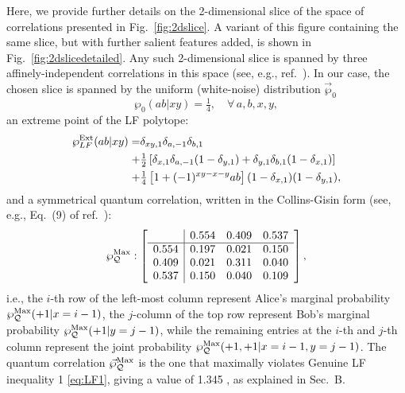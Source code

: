 \documentclass[aps,prx,twocolumn,superscriptaddress]{revtex4-1}
\theoremstyle{plain}
\newcommand{\ie}{i.e.}
\newcommand{\eg}{e.g.}
\begin{document}
Here, we provide further details on the 2-dimensional slice of the space of correlations presented in Fig.~\ref{fig:2dslice}. A variant of this figure containing the same slice, but with further salient features added, is shown in Fig.\ \ref{fig:2dslicedetailed}. Any such 2-dimensional slice is spanned by three affinely-independent correlations in this space (see, \eg, ref.~\cite{Goh18}). In our case, the chosen slice is spanned by the uniform (white-noise) distribution $\vec{\wp}_0$
\begin{equation}\label{eq:point1}
	\wp_0(ab|xy) = \tfrac{1}{4},\quad\forall\, a,b,x,y,
\end{equation}
an extreme point of the LF polytope:
\begin{equation}\label{eq:point2}
\begin{split}
	\wp^{\rm Ext}_{LF}(ab|xy) =
	&\delta_{xy,1}\delta_{a,-1}\delta_{b,1} \\
	+&\tfrac{1}{2}\left[ \delta_{x,1}\delta_{a,-1}(1-\delta_{y,1})+\delta_{y,1}\delta_{b,1}(1-\delta_{x,1}) \right]\\
	+ &\tfrac{1}{4}\left[1+(-1)^{xy-x-y}ab\right](1-\delta_{x,1})(1-\delta_{y,1}),
\end{split}
\end{equation}
 and a symmetrical quantum correlation, written in the Collins-Gisin form (see, \eg, Eq.~(9) of ref.~\cite{CollinsGisin}):
 \begin{equation}\label{eq:point3}
	 \wp^{\rm Max}_{\mathcal{Q}}:
	 \left[\begin{array}{c|ccc}
	  & 0.554 & 0.409 & 0.537\\ \hline
	 0.554 & 0.197 & 0.021 & 0.150\\ 
	 0.409 & 0.021 & 0.311 & 0.040\\ 
	 0.537 & 0.150 & 0.040 & 0.109\\ 
	 \end{array}
	 \right],
 \end{equation}
 \ie, the $i$-th row of the left-most column represent Alice's marginal probability $\wp^{\rm Max}_{\mathcal{Q}}(+1|x=i-1)$, the $j$-column of the top row represent Bob's marginal probability $\wp^{\rm Max}_{\mathcal{Q}}(+1|y=j-1)$, while the remaining entries at the $i$-th and $j$-th column represent the joint probability $\wp^{\rm Max}_{\mathcal{Q}}(+1,+1|x=i-1,y=j-1)$. The quantum correlation $\vec{\wp}^{\rm Max}_{\mathcal{Q}}$ is the one that maximally violates Genuine LF inequality 1 \eqref{eq:LF1}, giving a value of 1.345%
 , as explained in Sec.\ B.
 
\end{document}
